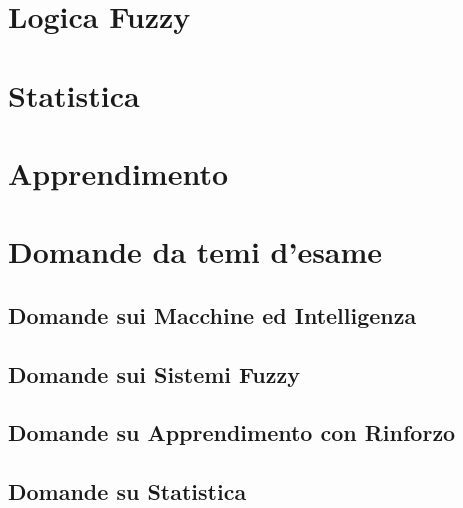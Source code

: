 \providecommand{\main}{.}








{\hypersetup{hidelinks}
	\tableofcontents  %
}

\chapter{Logica Fuzzy}


\chapter{Statistica}


\chapter{Apprendimento}


\appendix
\chapter{Domande da temi d'esame}

\section{Domande sui Macchine ed Intelligenza}


\section{Domande sui Sistemi Fuzzy}


\section{Domande su Apprendimento con Rinforzo}


\section{Domande su Statistica}



